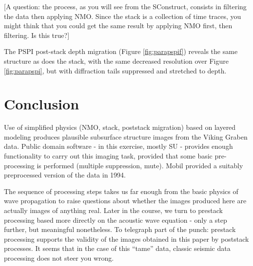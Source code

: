 
[A question: the process, as you will see from the SConstruct, consists in filtering the data then applying NMO. Since the stack is a collection of time traces, you might think that you could get the same result by applying NMO first, then filtering. Is this true?]

The PSPI post-stack depth migration (Figure \ref{fig:parapspif}) reveals the same structure as does the stack, with the same decreased resolution over Figure \ref{fig:parapspi}, but with diffraction tails suppressed and stretched to depth.


\section{Conclusion}
Use of simplified physics (NMO, stack, poststack migration) based on layered modeling produces plausible subsurface structure images from the Viking Graben data. Public domain software - in this exercise, mostly SU - provides enough functionality to carry out this imaging task, provided that some basic pre-processing is performed (multiple suppression, mute). Mobil provided a suitably preprocessed version of the data in 1994.

The sequence of processing steps takes us far enough from the basic physics of wave propagation to raise questions about whether the images produced here are actually images of anything real. Later in the course, we turn to prestack processing based more directly on the acoustic wave equation - only a step further, but meaningful nonetheless. To telegraph part of the punch: prestack processing supports the validity of the images obtained in this paper by poststack processes. It seems that in the case of this ``tame'' data, classic seismic data processing does not steer you wrong.


